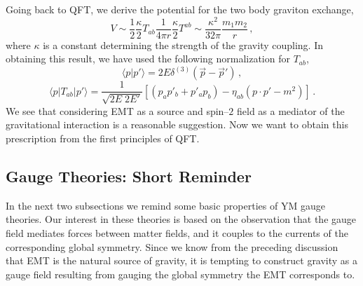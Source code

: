 \documentclass[11pt,a4paper]{article}
\begin{document}
Going back to QFT, we derive the potential for the two body graviton exchange,
\begin{equation}
V\sim\dfrac{1}{2}\dfrac{\kappa}{2}T_{ab}\dfrac{1}{4\pi r}\dfrac{\kappa}{2}T^{ab}\sim\dfrac{\kappa^2}{32\pi}\dfrac{m_1m_2}{r}   \,,
\end{equation}
where $\kappa$ is a constant determining the strength of the gravity coupling. In obtaining this result, we have used the following normalization for $T_{ab}$,
\begin{equation}
\langle p\vert p'\rangle=2E\delta^{(3)}(\vec{p}-\vec{p}')   \,,
\end{equation}
\begin{equation}
\langle p\vert T_{ab}\vert p'\rangle=\dfrac{1}{\sqrt{2E\;2E'}}\left[(p_a p'_b+p'_a p_b)-\eta_{ab}(p\cdot p'-m^2)\right]    \,.
\end{equation}
We see that considering EMT as a source and spin--$2$ field as a mediator of the gravitational interaction is a reasonable suggestion. Now we want to obtain this prescription from the first principles of QFT.

\subsection{Gauge Theories: Short Reminder}

In the next two subsections we remind some basic properties of YM gauge theories. Our interest in these theories is based on the observation that the gauge field mediates forces between matter fields, and it couples to the currents of the corresponding global symmetry. Since we know from the preceding discussion that EMT is the natural source of gravity, it is tempting to construct gravity as a gauge field resulting from gauging the global symmetry the EMT corresponds to.
\end{document}
